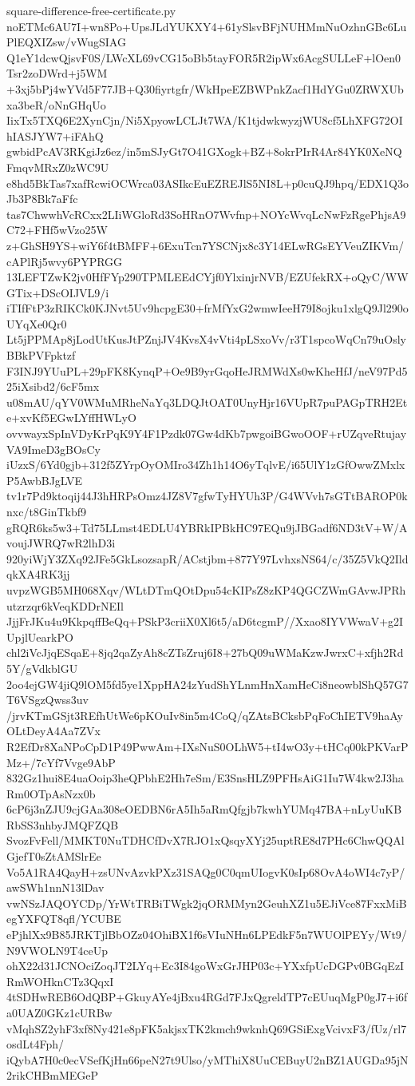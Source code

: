 \documentclass[11pt]{article}
\theoremstyle{definition}
\theoremstyle{remark}
\begin{document}
\begin{filecontents*}[overwrite]{square-difference-free-certificate.py}
noETMc6AU7I+wn8Po+UpsJLdYUKXY4+61ySlsvBFjNUHMmNuOzhnGBc6LuPlEQXIZsw/vWugSIAG
Q1eY1dcwQjsvF0S/LWcXL69vCG15oBb5tayFOR5R2ipWx6AcgSULLeF+lOen0Tsr2zoDWrd+j5WM
+3xj5bPj4wYVd5F77JB+Q30fiyrtgfr/WkHpeEZBWPnkZacf1HdYGu0ZRWXUbxa3beR/oNnGHqUo
IixTx5TXQ6E2XynCjn/Ni5XpyowLCLJt7WA/K1tjdwkwyzjWU8cf5LhXFG72OIhIASJYW7+iFAhQ
gwbidPcAV3RKgiJz6ez/in5mSJyGt7O41GXogk+BZ+8okrPIrR4Ar84YK0XeNQFmqvMRxZ0zWC9U
e8hd5BkTas7xafRcwiOCWrca03ASIkcEuEZREJlS5NI8L+p0cuQJ9hpq/EDX1Q3oJb3P8Bk7aFfc
tas7ChwwhVcRCxx2LIiWGloRd3SoHRnO7Wvfnp+NOYcWvqLcNwFzRgePhjsA9C72+FHf5wVzo25W
z+GhSH9YS+wiY6f4tBMFF+6ExuTcn7YSCNjx8c3Y14ELwRGsEYVeuZIKVm/cAPlRj5wvy6PYPRGG
13LEFTZwK2jv0HfFYp290TPMLEEdCYjf0YlxinjrNVB/EZUfekRX+oQyC/WWGTix+DScOIJVL9/i
iTIfFtP3zRIKCk0KJNvt5Uv9hcpgE30+frMfYxG2wmwIeeH79I8ojku1xlgQ9Jl290oUYqXe0Qr0
Lt5jPPMAp8jLodUtKusJtPZnjJV4KvsX4vVti4pLSxoVv/r3T1spcoWqCn79uOslyBBkPVFpktzf
F3INJ9YUuPL+29pFK8KynqP+Oe9B9yrGqoHeJRMWdXs0wKheHfJ/neV97Pd525iXsibd2/6cF5mx
u08mAU/qYV0WMuMRheNaYq3LDQJtOAT0UnyHjr16VUpR7puPAGpTRH2Ete+xvKf5EGwLYffHWLyO
ovvwayxSpInVDyKrPqK9Y4F1Pzdk07Gw4dKb7pwgoiBGwoOOF+rUZqveRtujayVA9ImeD3gBOsCy
iUzxS/6Yd0gjb+312f5ZYrpOyOMIro34Zh1h14O6yTqlvE/i65UlY1zGfOwwZMxlxP5AwbBJgLVE
tv1r7Pd9ktoqij44J3hHRPsOmz4JZ8V7gfwTyHYUh3P/G4WVvh7sGTtBAROP0knxc/t8GinTkbf9
gRQR6ks5w3+Td75LLmst4EDLU4YBRkIPBkHC97EQu9jJBGadf6ND3tV+W/AvoujJWRQ7wR2lhD3i
920yiWjY3ZXq92JFe5GkLsozsapR/ACstjbm+877Y97LvhxsNS64/c/35Z5VkQ2IldqkXA4RK3jj
uvpzWGB5MH068Xqv/WLtDTmQOtDpu54cKIPsZ8zKP4QGCZWmGAvwJPRhutzrzqr6kVeqKDDrNEIl
JjjFrJKu4u9KkpqffBeQq+PSkP3criiX0Xl6t5/aD6tcgmP//Xxao8IYVWwaV+g2IUpjlUearkPO
chl2iVcJjqESqaE+8jq2qaZyAh8cZTsZruj6I8+27bQ09uWMaKzwJwrxC+xfjh2Rd5Y/gVdkblGU
2oo4ejGW4jiQ9lOM5fd5ye1XppHA24zYudShYLnmHnXamHeCi8neowblShQ57G7T6VSgzQwss3uv
/jrvKTmGSjt3REfhUtWe6pKOuIv8in5m4CoQ/qZAtsBCksbPqFoChIETV9haAyOLtDeyA4Aa7ZVx
R2EfDr8XaNPoCpD1P49PwwAm+IXsNuS0OLhW5+tI4wO3y+tHCq00kPKVarPMz+/7cYf7Vvge9AbP
832Gz1hui8E4uaOoip3heQPbhE2Hh7eSm/E3SnsHLZ9PFHsAiG1Iu7W4kw2J3haRm0OTpAsNzx0b
6cP6j3nZJU9cjGAa308eOEDBN6rA5Ih5aRmQfgjb7kwhYUMq47BA+nLyUuKBRbSS3nhbyJMQFZQB
SvozFvFell/MMKT0NuTDHCfDvX7RJO1xQsqyXYj25uptRE8d7PHc6ChwQQAlGjefT0sZtAMSlrEe
Vo5A1RA4QayH+zsUNvAzvkPXz31SAQg0C0qmUIogvK0sIp68OvA4oWI4c7yP/awSWh1nnN13lDav
vwNSzJAQOYCDp/YrWtTRBiTWgk2jqORMMyn2GeuhXZ1u5EJiVce87FxxMiBegYXFQT8qfl/YCUBE
ePjhlXx9B85JRKTjlBbOZz04OhiBX1f6sVIuNHn6LPEdkF5n7WUOlPEYy/Wt9/N9VWOLN9T4ceUp
ohX22d31JCNOciZoqJT2LYq+Ec3I84goWxGrJHP03c+YXxfpUcDGPv0BGqEzIRmWOHknCTz3QqxI
4tSDHwREB6OdQBP+GkuyAYe4jBxu4RGd7FJxQgreldTP7cEUuqMgP0gJ7+i6fa0UAZ0GKz1cURBw
vMqhSZ2yhF3xf8Ny421e8pFK5akjsxTK2kmch9wknhQ69GSiExgVcivxF3/fUz/rl7osdLt4Fph/
iQybA7H0c0ecVSefKjHn66peN27t9Ulso/yMThiX8UuCEBuyU2nBZ1AUGDa95jN2rikCHBmMEGeP

\end{filecontents*}
\end{document}
